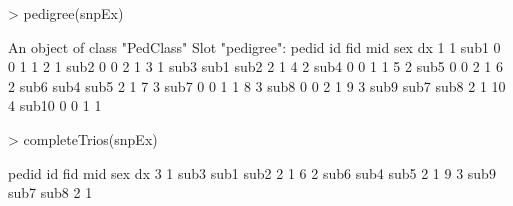 \documentclass[10pt]{article}
\begin{document}
\begin{Schunk}
\begin{Sinput}
> pedigree(snpEx)
\end{Sinput}
\begin{Soutput}
An object of class "PedClass"
Slot "pedigree":
   pedid    id  fid  mid sex dx
1      1  sub1    0    0   1  1
2      1  sub2    0    0   2  1
3      1  sub3 sub1 sub2   2  1
4      2  sub4    0    0   1  1
5      2  sub5    0    0   2  1
6      2  sub6 sub4 sub5   2  1
7      3  sub7    0    0   1  1
8      3  sub8    0    0   2  1
9      3  sub9 sub7 sub8   2  1
10     4 sub10    0    0   1  1
\end{Soutput}
\begin{Sinput}
> completeTrios(snpEx)
\end{Sinput}
\begin{Soutput}
  pedid   id  fid  mid sex dx
3     1 sub3 sub1 sub2   2  1
6     2 sub6 sub4 sub5   2  1
9     3 sub9 sub7 sub8   2  1
\end{Soutput}
\end{Schunk}
\end{document}
